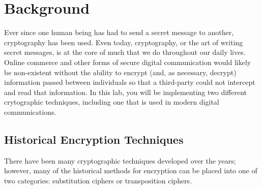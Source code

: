 	\section{Background}
		Ever since one human being has had to send a secret message to another, cryptography has been used. Even today, cryptography, or the art of writing secret messages, is at the core of much that we do throughout our daily lives. Online commerce and other forms of secure digital communication would likely be non-existent without the ability to encrypt (and, as necessary, decrypt) information passed between individuals so that a third-party could not intercept and read that information. In this lab, you will be implementing two different crytographic techniques, including one that is used in modern digital communications.

		\subsection{Historical Encryption Techniques}
			There have been many cryptographic techniques developed over the years; however, many of the historical methods for encryption can be placed into one of two categories: substitution ciphers or transposition ciphers.
